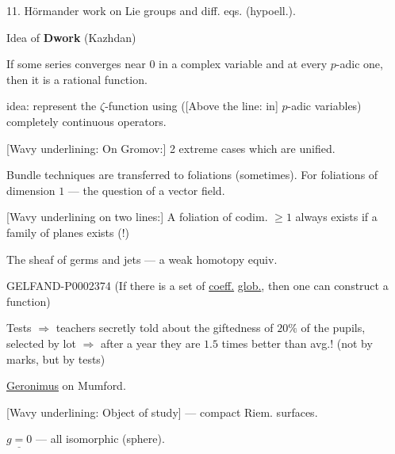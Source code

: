11. H\"ormander \quad work on Lie groups and diff. eqs. (hypoell.).



Idea of \textbf{Dwork} (Kazhdan)



If some series converges near $0$ in a complex variable and at every $p$-adic one, then it is a rational function.



idea: represent the $\zeta$-function using ([Above the line: in] $p$-adic variables) completely continuous operators.



[Wavy underlining: On Gromov:] 2 extreme cases which are unified.



Bundle techniques are transferred to foliations (sometimes). For foliations of dimension $1$ — the question of a vector field.



[Wavy underlining on two lines:]
A foliation of codim. $\geq1$ always exists if a family of planes exists (!)



The sheaf of germs and jets — a weak homotopy equiv.



\begin{GelfandAdjacentEvidence}{GELFAND-P000237}{4}
(If there is a set of \underline{coeff.} \underline{glob.}, then one can construct a function)



\end{GelfandAdjacentEvidence}

Tests $\Rightarrow$ teachers secretly told about the giftedness of $20\%$ of the pupils, selected by lot $\Rightarrow$ after a year they are $1.5$ times better than avg.! (not by marks, but by tests)





\underline{\underline{Geronimus}} on Mumford.



[Wavy underlining: Object of study] — compact Riem. surfaces.



$\underline{g=0}$ — all isomorphic (sphere).



